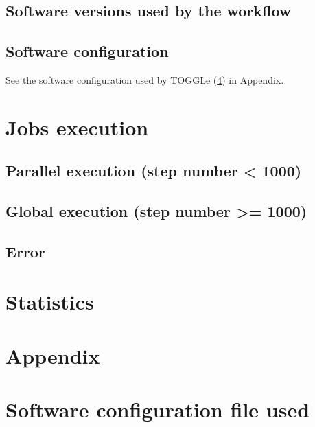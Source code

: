 \documentclass[a4paper]{article}
\begin{document}
\subsection{Software versions used by the workflow}

\begin{minipage}{\linewidth}

\end{minipage}

\subsection{Software configuration}
See the software configuration used by TOGGLe (\ref{appendix:config})  in Appendix.





\section{Jobs execution}

\subsection{Parallel execution (step number < 1000)}



\subsection{Global execution (step number >= 1000)}


\subsection{Error}

\newpage
\section{Statistics}



\cite{toggle}

\clearpage




\clearpage
\section{Appendix}\appendix

\section{ Software configuration file used}
\label{appendix:config}

\end{document}
